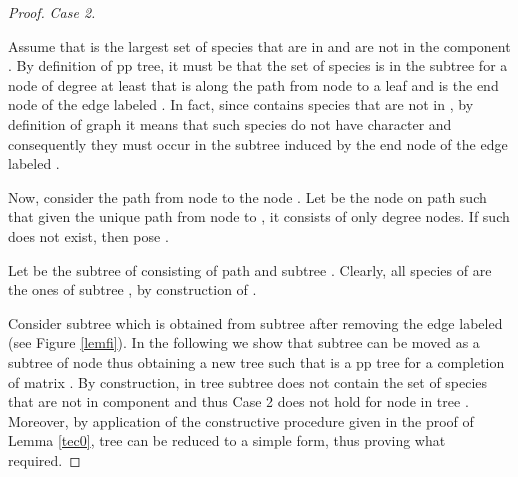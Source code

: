 \documentclass{llncs}
\begin{document}
\begin{proof}
 {\em Case 2.}
 
 Assume that  is the largest set of species that are in  and are not in the component 
. 
By definition of pp tree, it must be that the set of species  is in the subtree  for a node  of degree at least  that is along the path from node  to a leaf and is the end node of  the edge   labeled . In fact, since  contains species that are not in  , by definition of graph  it means that such species do not have character  and consequently they must occur in the subtree  induced by the end node of the edge labeled .

Now, consider the path  from node  to the node . Let  be the node on path  such that given the unique path  from node  to , it consists of only degree  nodes. If such  does not exist, then pose .

Let  be  the subtree  of  consisting of path  and subtree . Clearly, all species  of  are the ones of subtree , by construction of .

Consider subtree  which is obtained from subtree  after removing the edge labeled  (see Figure \ref{lemfi}).
In the following we show that subtree  can be moved as a subtree of node   thus obtaining a new tree  such that is a pp tree for a completion of matrix . By construction,  in tree    subtree  does not contain the set  of species that  are not in component  and thus Case 2 does not hold for node  in tree .
 Moreover, by application of the constructive procedure given in the proof of  Lemma \ref{tec0}, tree  can be reduced to a simple form, thus proving what required.





\end{proof}
\end{document}
